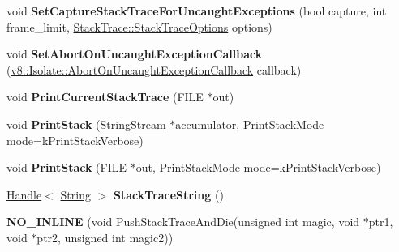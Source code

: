 \begin{DoxyCompactItemize}
\item 
void {\bfseries Set\+Capture\+Stack\+Trace\+For\+Uncaught\+Exceptions} (bool capture, int frame\+\_\+limit, \hyperlink{classv8_1_1_stack_trace_a9704e4a37949eb8eb8ccddbddf161492}{Stack\+Trace\+::\+Stack\+Trace\+Options} options)\hypertarget{classv8_1_1internal_1_1_isolate_a78f604bee42e9628f7e2c0ff1e8601e8}{}\label{classv8_1_1internal_1_1_isolate_a78f604bee42e9628f7e2c0ff1e8601e8}

\item 
void {\bfseries Set\+Abort\+On\+Uncaught\+Exception\+Callback} (\hyperlink{classv8_1_1_isolate_aeb1d49e500d9521b42743a6a740271e2}{v8\+::\+Isolate\+::\+Abort\+On\+Uncaught\+Exception\+Callback} callback)\hypertarget{classv8_1_1internal_1_1_isolate_af81d8aeb99dfbb28950ed1a51ec6b3f6}{}\label{classv8_1_1internal_1_1_isolate_af81d8aeb99dfbb28950ed1a51ec6b3f6}

\item 
void {\bfseries Print\+Current\+Stack\+Trace} (F\+I\+LE $\ast$out)\hypertarget{classv8_1_1internal_1_1_isolate_a2e087a2fe0e6578a42f02650507db595}{}\label{classv8_1_1internal_1_1_isolate_a2e087a2fe0e6578a42f02650507db595}

\item 
void {\bfseries Print\+Stack} (\hyperlink{classv8_1_1internal_1_1_string_stream}{String\+Stream} $\ast$accumulator, Print\+Stack\+Mode mode=k\+Print\+Stack\+Verbose)\hypertarget{classv8_1_1internal_1_1_isolate_a196bf9be1774a3e0d412bbefdfafb45b}{}\label{classv8_1_1internal_1_1_isolate_a196bf9be1774a3e0d412bbefdfafb45b}

\item 
void {\bfseries Print\+Stack} (F\+I\+LE $\ast$out, Print\+Stack\+Mode mode=k\+Print\+Stack\+Verbose)\hypertarget{classv8_1_1internal_1_1_isolate_a1c9e54103ad742a589b6f1605a0b4667}{}\label{classv8_1_1internal_1_1_isolate_a1c9e54103ad742a589b6f1605a0b4667}

\item 
\hyperlink{classv8_1_1internal_1_1_handle}{Handle}$<$ \hyperlink{classv8_1_1internal_1_1_string}{String} $>$ {\bfseries Stack\+Trace\+String} ()\hypertarget{classv8_1_1internal_1_1_isolate_a6dcfa7a6999e4785cba91f25d2df7433}{}\label{classv8_1_1internal_1_1_isolate_a6dcfa7a6999e4785cba91f25d2df7433}

\item 
{\bfseries N\+O\+\_\+\+I\+N\+L\+I\+NE} (void Push\+Stack\+Trace\+And\+Die(unsigned int magic, void $\ast$ptr1,                                                                                                                                               void $\ast$ptr2, unsigned int magic2))\hypertarget{classv8_1_1internal_1_1_isolate_aabc31949b117258281e5748d5a0fd1b5}{}\label{classv8_1_1internal_1_1_isolate_aabc31949b117258281e5748d5a0fd1b5}


\end{DoxyCompactItemize}

